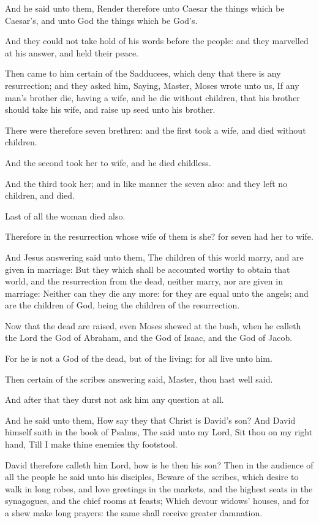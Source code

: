 \verse And he said unto them, Render therefore unto Caesar the things which be Caesar's, and unto God the things which be God's.

\verse And they could not take hold of his words before the people: and they marvelled at his answer, and held their peace.

\verse Then came to him certain of the Sadducees, which deny that there is any resurrection; and they asked him, \verse Saying, Master, Moses wrote unto us, If any man's brother die, having a wife, and he die without children, that his brother should take his wife, and raise up seed unto his brother.

\verse There were therefore seven brethren: and the first took a wife, and died without children.

\verse And the second took her to wife, and he died childless.

\verse And the third took her; and in like manner the seven also: and they left no children, and died.

\verse Last of all the woman died also.

\verse Therefore in the resurrection whose wife of them is she? for seven had her to wife.

\verse And Jesus answering said unto them, The children of this world marry, and are given in marriage: \verse But they which shall be accounted worthy to obtain that world, and the resurrection from the dead, neither marry, nor are given in marriage: \verse Neither can they die any more: for they are equal unto the angels; and are the children of God, being the children of the resurrection.

\verse Now that the dead are raised, even Moses shewed at the bush, when he calleth the Lord the God of Abraham, and the God of Isaac, and the God of Jacob.

\verse For he is not a God of the dead, but of the living: for all live unto him.

\verse Then certain of the scribes answering said, Master, thou hast well said.

\verse And after that they durst not ask him any question at all.

\verse And he said unto them, How say they that Christ is David's son?  \verse And David himself saith in the book of Psalms, The \LORD said unto my Lord, Sit thou on my right hand, \verse Till I make thine enemies thy footstool.

\verse David therefore calleth him Lord, how is he then his son?  \verse Then in the audience of all the people he said unto his disciples, \verse Beware of the scribes, which desire to walk in long robes, and love greetings in the markets, and the highest seats in the synagogues, and the chief rooms at feasts; \verse Which devour widows' houses, and for a shew make long prayers: the same shall receive greater damnation.



